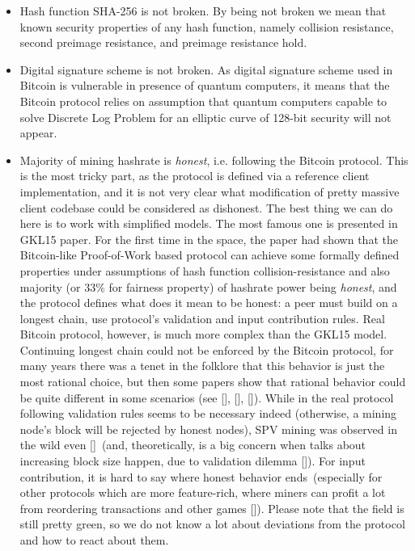 \documentclass{article}   %
\begin{document}
\begin{itemize}
\item{} Hash function SHA-256 is not broken. By being not broken we mean that known security properties of any hash function, namely collision resistance, second preimage resistance, and preimage resistance hold.   
\item{} Digital signature scheme is not broken. As digital signature scheme used in Bitcoin is vulnerable in presence of quantum computers, it means that the Bitcoin protocol relies on assumption that quantum computers capable to solve Discrete Log Problem for an elliptic curve of 128-bit security will not appear.
\item{} Majority of mining hashrate is {\em honest}, i.e. following the Bitcoin protocol. This is the most tricky part, as the protocol is defined via a reference client implementation, and it is not very clear what modification of pretty massive client codebase could be considered as dishonest. The best thing we can do here is to work with simplified models. The most famous one is presented in GKL15 paper.
For the first time in the space, the paper had shown that the Bitcoin-like Proof-of-Work based protocol can achieve some formally defined properties under assumptions of hash function collision-resistance and also majority (or $33\%$ for fairness property) of hashrate power being {\em honest}, and the protocol defines what does it mean to be honest: a peer must build on a longest chain, use protocol's validation and input contribution rules.
Real Bitcoin protocol, however, is much more complex than the GKL15 model. Continuing longest chain could not be enforced by the Bitcoin protocol, for many years there was a tenet in the folklore that this behavior is just the most rational choice, but then some papers show that rational behavior could be quite different in some scenarios (see [], [], []). While in the real protocol following validation rules seems to be necessary indeed (otherwise, a mining node's block will be rejected by honest nodes), SPV mining was observed in the wild even []~(and, theoretically, is a big concern when talks about increasing block size happen, due to validation dilemma []). For input contribution, it is hard to say where honest behavior ends~(especially for other protocols which are more feature-rich, where miners can profit a lot from reordering transactions and other games []). Please note that the field is still pretty green, so we do not know a lot about deviations from the protocol and how to react about them.    
\end{itemize}
\end{document}
